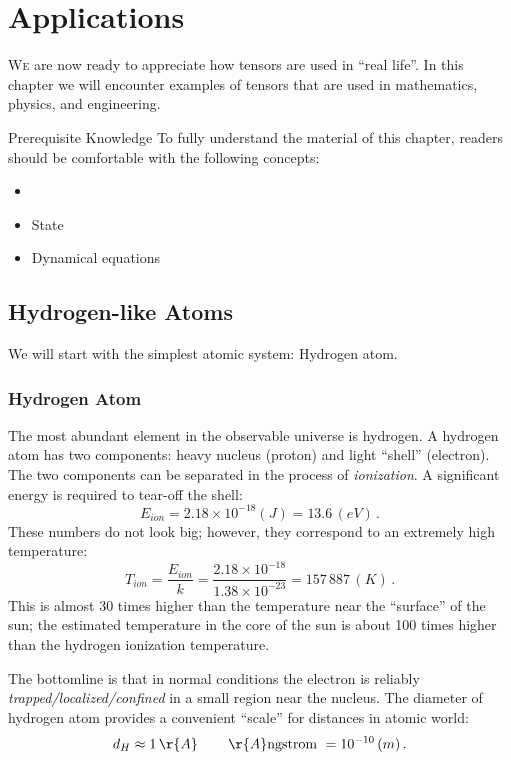\graphicspath{{../06Applications/pics/}}

\chapter{Applications}\label{ch:Applications}
\lettrine[lines=2]{\color{darkocre}W}{e} are now ready to appreciate
how tensors are used in ``real life''. In this chapter we will
encounter examples of
tensors that are used in mathematics, physics, and engineering. 

\begin{myprereq}{Prerequisite Knowledge}
	To fully understand the material of this chapter, readers should be comfortable with the following concepts:
	
	\begin{itemize}
		\item \phantom{phantom}
		\vspace{-0.5cm}
		\item State
		\item Dynamical equations
	\end{itemize}	
\end{myprereq}

\section{Hydrogen-like Atoms}
We will start with the simplest atomic system: Hydrogen atom.

\subsection{Hydrogen Atom}
The most abundant element in the observable universe is hydrogen. A
hydrogen atom has two components: heavy nucleus (proton) and light
``shell'' (electron). The two components can be separated in the
process of \emph{ionization}. A significant energy is required to
tear-off the shell:
\[
E_{ion} = 2.18\times 10^{-18} (J) = 13.6\, (eV)\,.
\]
These numbers do not look big; however, they correspond to an extremely
high temperature:
\[
T_{ion} = \frac{E_{ion}}{k} = \frac{2.18\times 10^{-18}}{1.38\times
	10^{-23}} = 157\,887\, (K)\,.
\]
This is almost 30 times higher than the temperature near the
``surface'' of the sun; the estimated temperature in the core of the
sun is about 100 times higher than the hydrogen ionization
temperature.

The bottomline is that in normal conditions the electron is reliably
\emph{trapped/localized/confined} in a small region near the nucleus. The
diameter of hydrogen atom provides a convenient ``scale'' for
distances in atomic world:
\[
d_H \approx 1\, \r{A}\,\qquad \r{A}\textrm{ngstrom } = 10^{-10}\, (m)\,.
\]

